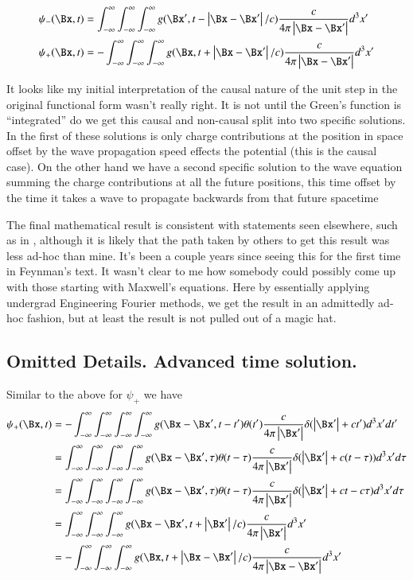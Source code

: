 \begin{align}
{\psi}_{-}(\Bx, t) &= \IIinf \IIinf \IIinf g(\Bx', t - \Abs{\Bx - \Bx'}/c) \frac{c }{4\pi \Abs{\Bx - \Bx'}} d^3 x' \\
{\psi}_{+}(\Bx, t) &= -\IIinf \IIinf \IIinf g(\Bx, t + \Abs{\Bx -\Bx'}/c) \frac{c }{4\pi \Abs{\Bx -\Bx'}} d^3 x'
\end{align}

It looks like my initial interpretation of the causal nature of the unit step in the original functional form wasn't really right.  It is not
until the Green's function is ``integrated'' do we get this causal and non-causal split into two specific solutions.
In the first of these solutions is only charge contributions at the position in space offset by the wave propagation speed effects the
potential (this is the causal case).  On the other hand we have a second specific solution to the wave equation
summing the charge contributions at all the future positions, this time offset by the time it takes a wave to propagate backwards from that future spacetime

The final mathematical result is consistent with statements seen elsewhere, such as in \cite{feynman1963flp}, although it is
likely that the path taken by others to get this result was less ad-hoc than mine.
It's been a couple years since seeing this for the
first time in Feynman's text.
It wasn't clear to me how somebody could possibly come up with those starting with Maxwell's equations.
Here by essentially applying undergrad Engineering Fourier methods, we get the result in an admittedly ad-hoc fashion, but at least the result is not
pulled out of a magic hat.

\subsection{Omitted Details.  Advanced time solution. }

Similar to the above for $\psi_{+}$ we have
\begin{align*}
{\psi}_{+}(\Bx, t)
&= -\IIinf \IIinf \IIinf \IIinf g(\Bx - \Bx', t - t') \theta(t') \frac{c }{4\pi \Abs{\Bx'}} \delta(\Abs{\Bx'} + c t') d^3 x' dt' \\
&= \IIinf \IIinf \IIinf \IIinf g(\Bx - \Bx', \tau) \theta(t -\tau) \frac{c }{4\pi \Abs{\Bx'}} \delta(\Abs{\Bx'} + c (t -\tau)) d^3 x' d\tau \\
&= \IIinf \IIinf \IIinf \IIinf g(\Bx - \Bx', \tau) \theta(t -\tau) \frac{c }{4\pi \Abs{\Bx'}} \delta(\Abs{\Bx'} + c t -c\tau) d^3 x' d\tau \\
&= \IIinf \IIinf \IIinf g(\Bx - \Bx', t + \Abs{\Bx'}/c) \frac{c }{4\pi \Abs{\Bx'}} d^3 x' \\
&= -\IIinf \IIinf \IIinf g(\Bx, t + \Abs{\Bx -\Bx'}/c) \frac{c }{4\pi \Abs{\Bx -\Bx'}} d^3 x' \\
\end{align*}

